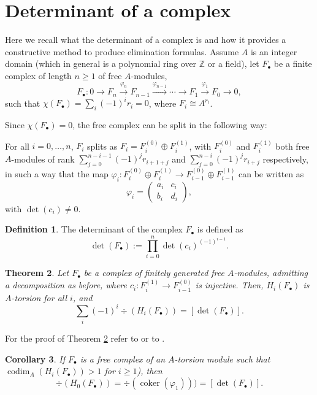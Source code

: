 \documentclass[10pt]{amsart}
\theoremstyle{plain}
\newtheorem{thm}{Theorem}[section]
\newtheorem{cor}[thm]{Corollary}
\theoremstyle{definition}
\newtheorem{defn}[thm]{Definition}
\def\ZZ{{\mathbb{Z}}}
\def\b{\beta}
\def\F.{F_\bullet}
\def\lto{\longrightarrow}
\DeclareMathOperator\codim{codim}
\DeclareMathOperator\coker{coker}
\begin{document}
  

\section{Determinant of a complex}\label{secDetComplex}

Here we recall what the determinant of a complex is and how it provides a constructive method to produce elimination formulas. Assume $A$ is an integer domain (which in general is a polynomial ring over $\ZZ$ or a field), let $\F.$ be a finite complex of length $n\geq 1$ of free $A$-modules, 
\[
\F. : 0\lto F_n\stackrel{\varphi_n}{\lto} F_{n-1}\stackrel{\varphi_{n-1}}{\lto}\cdots \lto F_1\stackrel{\varphi_1}{\lto} F_0\lto 0,
\]
such that $\chi(\F.)=\sum_i (-1)^ir_i=0$, where $F_i\cong A^{r_i}$.

\bigskip
Since $\chi(\F.)=0$, the free complex can be split in the following way:

For all $i=0,\hdots,n$, $F_i$ splits as $F_i=F^{(0)}_i\oplus F^{(1)}_i$, with $F^{(0)}_i$ and $F^{(1)}_i$ both free $A$-modules of rank $\sum_{j=0}^{n-i-1}(-1)^jr_{i+1+j}$ and $\sum_{j=0}^{n-i}(-1)^jr_{i+j}$ respectively, in such a way that the map $\varphi_i:F^{(0)}_i\oplus F^{(1)}_i\to F^{(0)}_{i-1}\oplus F^{(1)}_{i-1}$ can be written as 
\[
\varphi_i=\left( \begin{array}{cc} a_i& c_i \\b_i &d_i \end{array}\right),
\]
with $\det(c_i)\neq 0$.

\begin{defn}
The determinant of the complex $\F.$ is defined as
\[
 \det(\F.):=\prod_{i=0}^n\det(c_i)^{(-1)^{i-1}}.
\]
\end{defn}

\begin{thm}\label{thmDetComp}
 Let $\F.$ be a complex of finitely generated free $A$-modules, admitting a decomposition as before, where $c_i: F_i^{(1)}\to F_{i-1}^{(0)}$ is injective. Then, $H_i(\F.)$ is $A$-torsion for all $i$, and 
\[
 \sum_i (-1)^i \div(H_i(\F.)) = [\det(\F.)].
\]
\end{thm}
For the proof of Theorem \ref{thmDetComp} refer to \cite{Cha1} or to \cite{Dem84}.

\begin{cor} 
If $\F.$ is a free complex of an $A$-torsion module such that $\codim_A(H_i(\F.))> 1$ for $i\geq 1$), then
\[
\div(H_0(\F.))=\div(\coker(\varphi_1)))=[\det(\F.)].
\]
\end{cor}
\end{document}
